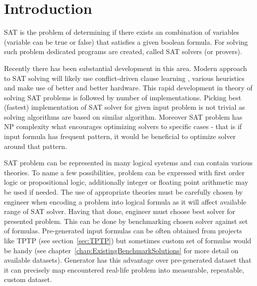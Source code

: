 \chapter{Introduction} \label{cha:Introduction}

\gls{SAT} is the problem of determining if there exists an combination of variables (variable can be true or false) that satisfies a given boolean formula. For solving such problem dedicated programs are created, called SAT solvers (or provers). 

Recently there has been substantial development in this area. Modern approach to SAT solving will likely use conflict-driven clause learning \cite{series/faia/SilvaLM09}, various heuristics and make use of better and better hardware. This rapid development in theory of solving SAT problems is followed by number of implementations. Picking best (fastest) implementation of SAT solver for given input problem is not trivial as solving algorithms are based on similar algorithm. Moreover SAT problem has NP complexity what encourages optimizing solvers to specific cases - that is if input formula has frequent pattern, it would be beneficial to optimize solver around that pattern.

SAT problem can be represented in many logical systems and can contain various theories. To name a few possibilities, problem can be expressed with first order logic or propositional logic, additionally integer or floating point arithmetic may be used if needed. The use of appropriate theories must be carefully chosen by engineer when encoding a problem into logical formula as it will affect available range of SAT solver. Having that done, engineer must choose best solver for presented problem. This can be done by benchmarking chosen solver against set of formulas. Pre-generated input formulas can be often obtained from projects like \gls{TPTP} (see section~\ref{sec:TPTP}) but sometimes custom set of formulas would be handy (see chapter~\ref{chap:ExistingBenchmarkSolutions} for more detail on available datasets). Generator has this advantage over pre-generated dataset that it can precisely map encountered real-life problem into measurable, repeatable, custom dataset.

